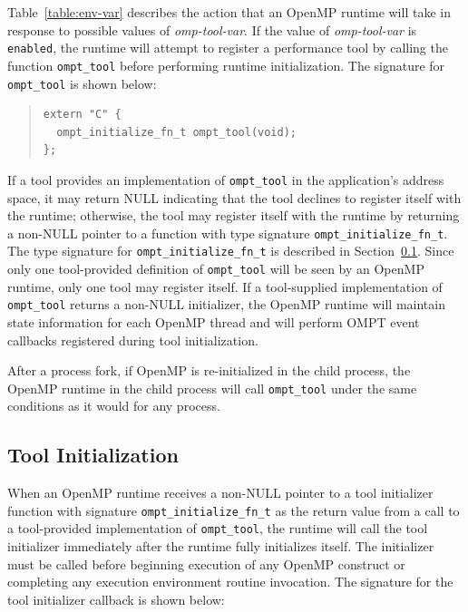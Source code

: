 \documentclass{article}
\begin{document}
\sloppy
Table~\ref{table:env-var} describes the action that an OpenMP runtime will take in response to possible values of {\em omp-tool-var}.
If the value of {\em omp-tool-var}  is  \verb|enabled|, the runtime will attempt to register  a performance tool by calling the function \verb|ompt_tool| before performing  runtime initialization. The signature for  \verb|ompt_tool|  is shown below:
\begin{quote}
\begin{verbatim}
extern "C" {
  ompt_initialize_fn_t ompt_tool(void);
};
\end{verbatim}
\end{quote}
 If a tool provides an implementation of \verb|ompt_tool| in the application's address space, it may return NULL indicating that the tool declines to register itself with the runtime; otherwise, the tool  may register itself with the runtime by returning a non-NULL pointer to a function with type signature \verb|ompt_initialize_fn_t|. The type signature for \verb|ompt_initialize_fn_t| is described in Section~\ref{sec:init}. 
Since only one tool-provided definition of \verb|ompt_tool| will be seen by an OpenMP runtime, only one tool may register itself. 
If a tool-supplied implementation of \verb|ompt_tool| returns a non-NULL initializer, the OpenMP runtime will maintain state information for each OpenMP thread and will perform OMPT event callbacks registered during tool initialization. 

After a process fork, if OpenMP is re-initialized in the child process,
the OpenMP runtime in the child process will call  \verb|ompt_tool| under the same conditions as it would for any process. 

\subsection{Tool Initialization}
\label{sec:init}

When an OpenMP runtime receives a non-NULL pointer to a tool initializer function with signature \verb|ompt_initialize_fn_t| as the return value from a call to a tool-provided implementation of \verb|ompt_tool|, the runtime will call the tool initializer immediately after the runtime fully initializes itself. The initializer must be called before beginning execution of any OpenMP construct or completing any execution environment  routine invocation.  The signature for the tool initializer callback is shown below:
\end{document}
